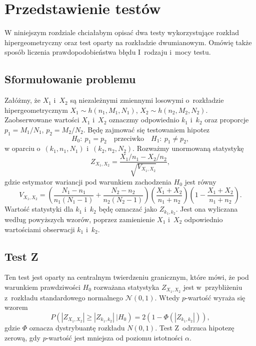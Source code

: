 \chapter{Przedstawienie testów}

W niniejszym rozdziale chciałabym opisać dwa testy wykorzystujące rozkład hipergeometryczny oraz test oparty na rozkładzie dwumianowym. Omówię także sposób liczenia prawdopodobieństwa błędu I~rodzaju i~mocy testu.

\section{Sformułowanie problemu}
Załóżmy, że $X_1$ i~$X_2$ są niezależnymi zmiennymi losowymi o~rozkładzie hipergeometrycznym $X_1\sim h(n_1,M_1,N_1)$, $X_2\sim h(n_2,M_2,N_2)$. Zaobserwowane wartości $X_1$ i~$X_2$ oznaczmy odpowiednio $k_1$ i~$k_2$ oraz proporcje $p_1=M_1/N_1$, $p_2=M_2/N_2$. Będę zajmować się testowaniem hipotez
\begin{equation}
H_0{:}\ p_1=p_2\quad \text{przeciwko} \quad H_1{:}\ p_1\neq p_2,
\end{equation}
w oparciu o~$(k_1,n_1,N_1)$ i~$(k_2,n_2,N_2)$.
Rozważmy unormowaną statystykę
\begin{equation}
Z_{X_1,X_2} = \frac{X_1/n_1-X_2/n_2}{\sqrt{V_{X_1,X_2}}},
\end{equation}
gdzie estymator wariancji pod warunkiem zachodzenia $H_0$ jest równy
\begin{equation}
V_{X_1,X_2} = \left(\frac{N_1-n_1}{n_1(N_1-1)}+\frac{N_2-n_2}{n_2(N_2-1)}\right)\left(\frac{X_1+X_2}{n_1+n_2}\right)\left(1-\frac{X_1+X_2}{n_1+n_2}\right).
\end{equation}
Wartość statystyki dla $k_1$ i~$k_2$ będę oznaczać jako $Z_{k_1,k_2}$. Jest ona wyliczana według powyższych wzorów, poprzez zamienienie $X_1$ i~$X_2$ odpowiednio wartościami obserwacji $k_1$ i~$k_2$.

\section{Test Z}
Ten test jest oparty na centralnym twierdzeniu granicznym, które mówi, że pod warunkiem prawdziwości $H_0$ rozważana statystyka $Z_{X_1,X_2}$ jest w~przybliżeniu z~rozkładu standardowego normalnego $\mathcal{N}(0,1)$. Wtedy $p$-wartość wyraża się wzorem
\begin{equation}
P(|Z_{X_1,X_2}|\geq|Z_{k_1,k_2}|\ |H_0) = 2(1-\Phi(|Z_{k_1,k_2}|)),
\end{equation}
gdzie $\Phi$ oznacza dystrybuantę rozkładu $N(0,1)$. Test Z~odrzuca hipotezę zerową, gdy $p$-wartość jest mniejsza od poziomu istotności $\alpha$.

